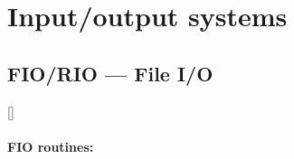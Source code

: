\newpage

\section{Input/output systems}

\subsection{FIO/RIO --- File I/O}
\label{R_FIO}

\vspace{-9mm}

\hfill []

\vspace{2mm}

\paragraph{FIO routines:}

